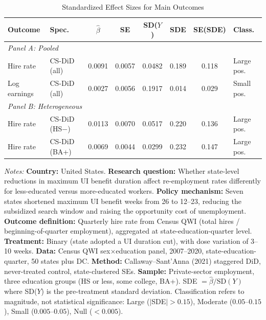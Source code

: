 
\begin{table}[H]
\centering
\caption{Standardized Effect Sizes for Main Outcomes}
\label{tab:sde}
{\footnotesize
\begin{tabular}{llcccccl}
\toprule
Outcome & Spec. & $\hat{\beta}$ & SE & SD($Y$) & SDE & SE(SDE) & Class. \\
\midrule
\multicolumn{8}{l}{\textit{Panel A: Pooled}} \\
Hire rate & CS-DiD (all) & 0.0091 & 0.0057 & 0.0482 & 0.189 & 0.118 & Large pos. \\
Log earnings & CS-DiD (all) & 0.0027 & 0.0056 & 0.1917 & 0.014 & 0.029 & Small pos. \\
\midrule
\multicolumn{8}{l}{\textit{Panel B: Heterogeneous}} \\
Hire rate & CS-DiD (HS$-$) & 0.0113 & 0.0070 & 0.0517 & 0.220 & 0.136 & Large pos. \\
Hire rate & CS-DiD (BA+) & 0.0069 & 0.0044 & 0.0299 & 0.232 & 0.147 & Large pos. \\
\bottomrule
\end{tabular}
}%
\par\vspace{0.5em}
\parbox{\textwidth}{\scriptsize
\textit{Notes:}
\textbf{Country:} United States.
\textbf{Research question:} Whether state-level reductions in maximum UI benefit duration affect re-employment rates differently for less-educated versus more-educated workers.
\textbf{Policy mechanism:} Seven states shortened maximum UI benefit weeks from 26 to 12--23, reducing the subsidized search window and raising the opportunity cost of unemployment.
\textbf{Outcome definition:} Quarterly hire rate from Census QWI (total hires / beginning-of-quarter employment), aggregated at state-education-quarter level.
\textbf{Treatment:} Binary (state adopted a UI duration cut), with dose variation of 3--10 weeks.
\textbf{Data:} Census QWI sex$\times$education panel, 2007--2020, state-education-quarter, 50 states plus DC.
\textbf{Method:} Callaway--Sant'Anna (2021) staggered DiD, never-treated control, state-clustered SEs.
\textbf{Sample:} Private-sector employment, three education groups (HS or less, some college, BA+).
SDE $= \hat{\beta} / \text{SD}(Y)$ where SD($Y$) is the pre-treatment standard deviation.
Classification refers to magnitude, not statistical significance:
Large ($|$SDE$| > 0.15$), Moderate ($0.05$--$0.15$), Small ($0.005$--$0.05$), Null ($< 0.005$).
}
\end{table}
